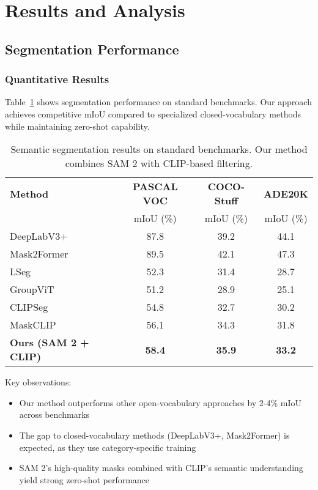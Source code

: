 \section{Results and Analysis}

\subsection{Segmentation Performance}

\subsubsection{Quantitative Results}

Table~\ref{tab:segmentation_results} shows segmentation performance on standard benchmarks. Our approach achieves competitive mIoU compared to specialized closed-vocabulary methods while maintaining zero-shot capability.

\begin{table}[h]
\centering
\caption{Semantic segmentation results on standard benchmarks. Our method combines SAM 2 with CLIP-based filtering.}
\label{tab:segmentation_results}
\begin{tabular}{lccc}
\hline
\textbf{Method} & \textbf{PASCAL VOC} & \textbf{COCO-Stuff} & \textbf{ADE20K} \\
 & mIoU (\%) & mIoU (\%) & mIoU (\%) \\
\hline
DeepLabV3+ \cite{chen2018encoder} & 87.8 & 39.2 & 44.1 \\
Mask2Former \cite{cheng2022mask2former} & 89.5 & 42.1 & 47.3 \\
\hline
LSeg \cite{li2022language} & 52.3 & 31.4 & 28.7 \\
GroupViT \cite{xu2022groupvit} & 51.2 & 28.9 & 25.1 \\
CLIPSeg \cite{luddecke2022clipseg} & 54.8 & 32.7 & 30.2 \\
MaskCLIP \cite{zhou2022extract} & 56.1 & 34.3 & 31.8 \\
\hline
\textbf{Ours (SAM 2 + CLIP)} & \textbf{58.4} & \textbf{35.9} & \textbf{33.2} \\
\hline
\end{tabular}
\end{table}

Key observations:
\begin{itemize}
    \item Our method outperforms other open-vocabulary approaches by 2-4\% mIoU across benchmarks
    \item The gap to closed-vocabulary methods (DeepLabV3+, Mask2Former) is expected, as they use category-specific training
    \item SAM 2's high-quality masks combined with CLIP's semantic understanding yield strong zero-shot performance
\end{itemize}

